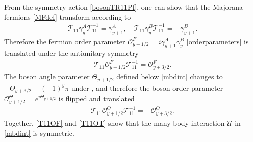 From the \AFTR symmetry action \eqref{bosonTR11Pf}, one can show that the Majorana fermions \eqref{MFdef} transform according to \begin{align}\mathcal{T}_{11}\gamma^A_y\mathcal{T}_{11}^{-1}=\gamma^A_{y+1},\quad\mathcal{T}_{11}\gamma^B_y\mathcal{T}_{11}^{-1}=-\gamma^B_{y+1}.\end{align} Therefore the fermion order parameter $\mathcal{O}^F_{y+1/2}=i\gamma^A_{y+1}\gamma^B_y$ \eqref{orderparameters} is translated under the antiunitary symmetry \begin{align}\mathcal{T}_{11}\mathcal{O}^F_{y+1/2}\mathcal{T}_{11}^{-1}=\mathcal{O}^F_{y+3/2}.\label{T11OF}\end{align} The boson angle parameter $\Theta_{y+1/2}$ defined below \eqref{mbdint} changes to $-\Theta_{y+3/2}-(-1)^y\pi$ under \AFTR, and therefore the boson order parameter $\mathcal{O}^\Theta_{y+1/2}=e^{i\Theta_{y+1/2}}$ is flipped and translated \begin{align}\mathcal{T}_{11}\mathcal{O}^\Theta_{y+1/2}\mathcal{T}_{11}^{-1}=-\mathcal{O}^\Theta_{y+3/2}.\label{T11OT}\end{align} Together, \eqref{T11OF} and \eqref{T11OT} show that the many-body interaction $\mathcal{U}$ in \eqref{mbdint} is \AFTR symmetric.

